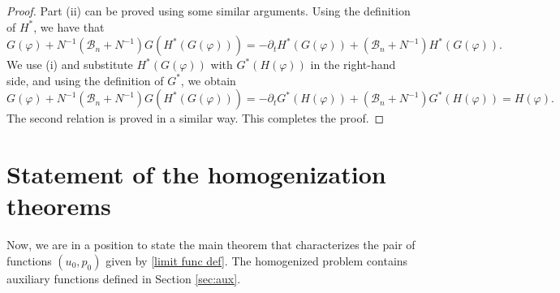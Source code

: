\documentclass[10pt,a4paper]{amsart}
\numberwithin{equation}{section}
\begin{document}
\begin{proof}
Part (ii) can be proved using some similar arguments. Using the
definition of $H^{\ast }$, we have that
\[
G(\varphi )+N^{-1}(\mathcal{B}_n+N^{-1})G(H^{\ast }(G(\varphi
)))=-\partial _{t}H^{\ast }(G(\varphi ))+(\mathcal{B}_n+N^{-1})H^{\ast
}(G(\varphi )).
\]%
We use (i) and substitute $H^{\ast }(G(\varphi ))$ with
$G^{\ast}(H(\varphi ))$ in the right-hand side, and using the definition of
$G^{\ast}$, we obtain
\[
G(\varphi )+N^{-1}(\mathcal{B}_n+N^{-1})G(H^{\ast }(G(\varphi
)))=-\partial _{t}G^{\ast }(H(\varphi ))+(\mathcal{B}_n+N^{-1})G^{\ast
}(H(\varphi ))=H(\varphi ).
\]%
The second relation is proved in a similar way. This completes the proof.
\end{proof}

\section{Statement of the homogenization theorems}

Now, we are in a position to state the main theorem that characterizes the
pair of functions $(u_0, p_0)$ given by \eqref{limit func def}. 
The homogenized problem contains auxiliary functions defined in Section \ref{sec:aux}.
\end{document}
